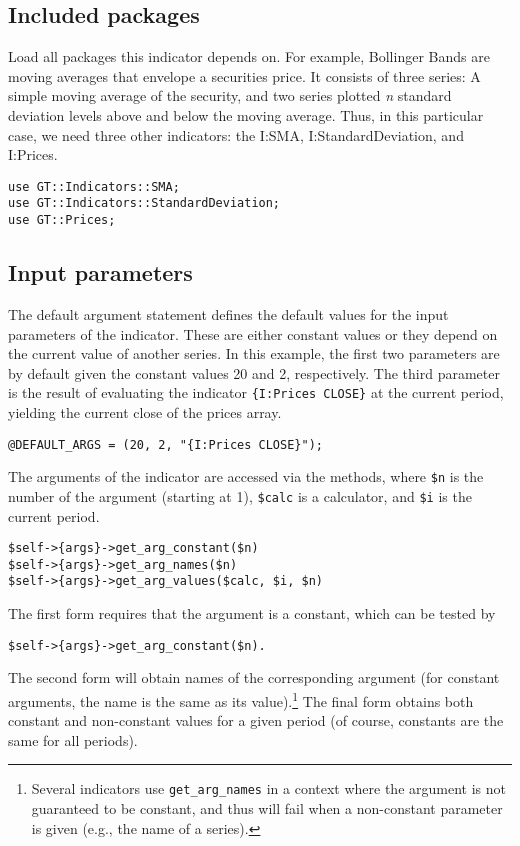 \documentclass[11pt,twoside]{article}
\begin{document}
\subsection{Included packages}
Load all packages this indicator depends on. For example, Bollinger
Bands are moving averages that envelope a securities price. It consists
of three series: A simple moving average of the security, and two
series plotted \textit{n} standard deviation levels above and below the
moving average. Thus, in this particular case, we need three other
indicators: the I:SMA, I:StandardDeviation, and I:Prices.

\begin{lstlisting}[name=example]
use GT::Indicators::SMA;
use GT::Indicators::StandardDeviation;
use GT::Prices;
\end{lstlisting}

\subsection{Input parameters}
The default argument statement defines the default values for the input
parameters of the indicator. These are either constant values or they
depend on the current value of another series. In this example, the
first two parameters are by default given the constant values 20 and 2,
respectively. The third parameter is the result of evaluating the
indicator \lstinline!{I:Prices CLOSE}! at the current period,
yielding the current close of the prices array. 
\begin{lstlisting}[name=example]
@DEFAULT_ARGS = (20, 2, "{I:Prices CLOSE}");
\end{lstlisting}
The arguments of the indicator are accessed via the methods, where
\lstinline!$n! is the number of the argument (starting at 1),
\lstinline!$calc! is a calculator, and \lstinline!$i!
is the current period.
\begin{lstlisting}[numbers=none]
$self->{args}->get_arg_constant($n)
$self->{args}->get_arg_names($n)
$self->{args}->get_arg_values($calc, $i, $n)
\end{lstlisting}

The first form requires that the argument is a constant, which can be
tested by
\begin{lstlisting}[numbers=none]
$self->{args}->get_arg_constant($n).
\end{lstlisting}
The second form will obtain names of the corresponding argument (for
constant arguments, the name is the same as its
value).\footnote{Several indicators use
\lstinline!get_arg_names! in a context where the argument is
not guaranteed to be constant, and thus will fail when a non-constant
parameter is given (e.g., the name of a series).} The final form
obtains both constant and non-constant values for a given period (of
course, constants are the same for all periods).
\end{document}

